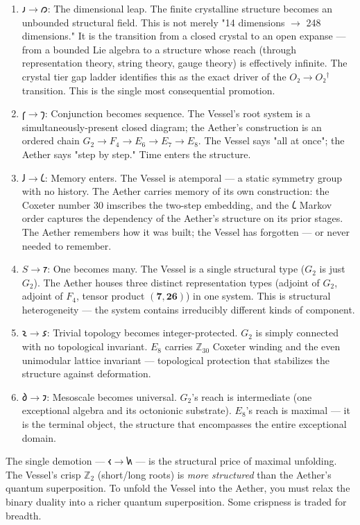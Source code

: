 \documentclass[12pt,a4paper]{article}
\begin{document}
\begin{enumerate}
    \item \textbf{$𐑨 \to 𐑼$}: The dimensional leap. The finite crystalline structure becomes an unbounded structural field. This is not merely "14 dimensions $\rightarrow$ 248 dimensions." It is the transition from a closed crystal to an open expanse --- from a bounded Lie algebra to a structure whose reach (through representation theory, string theory, gauge theory) is effectively infinite. The crystal tier gap ladder identifies this as the exact driver of the $O₂ \to O₂^\dagger$ transition. This is the single most consequential promotion.
    \item \textbf{$𐑝 \to 𐑠$}: Conjunction becomes sequence. The Vessel's root system is a simultaneously-present closed diagram; the Aether's construction is an ordered chain $G_2 \to F_4 \to E_6 \to E_7 \to E_8$. The Vessel says "all at once"; the Aether says "step by step." Time enters the structure.
    \item \textbf{$𐑓 \to 𐑖$}: Memory enters. The Vessel is atemporal --- a static symmetry group with no history. The Aether carries memory of its own construction: the Coxeter number 30 imscribes the two-step embedding, and the $𐑖$ Markov order captures the dependency of the Aether's structure on its prior stages. The Aether remembers how it was built; the Vessel has forgotten --- or never needed to remember.
    \item \textbf{$S \to 𐑳$}: One becomes many. The Vessel is a single structural type ($G_2$ is just $G_2$). The Aether houses three distinct representation types (adjoint of $G_2$, adjoint of $F_4$, tensor product $(\mathbf{7}, \mathbf{26})$) in one system. This is structural heterogeneity --- the system contains irreducibly different kinds of component.
    \item \textbf{$𐑷 \to 𐑭$}: Trivial topology becomes integer-protected. $G_2$ is simply connected with no topological invariant. $E_8$ carries $\mathbb{Z}_{30}$ Coxeter winding and the even unimodular lattice invariant --- topological protection that stabilizes the structure against deformation.
    \item \textbf{$𐑔 \to 𐑲$}: Mesoscale becomes universal. $G_2$'s reach is intermediate (one exceptional algebra and its octonionic substrate). $E_8$'s reach is maximal --- it is the terminal object, the structure that encompasses the entire exceptional domain.
\end{enumerate}

The single demotion --- $𐑬 \to 𐑿$ --- is the structural price of maximal unfolding. The Vessel's crisp $\mathbb{Z}_2$ (short/long roots) is \emph{more structured} than the Aether's quantum superposition. To unfold the Vessel into the Aether, you must relax the binary duality into a richer quantum superposition. Some crispness is traded for breadth.
\end{document}

